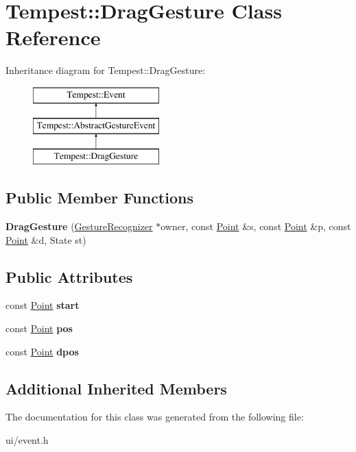 \hypertarget{class_tempest_1_1_drag_gesture}{\section{Tempest\+:\+:Drag\+Gesture Class Reference}
\label{class_tempest_1_1_drag_gesture}
}
Inheritance diagram for Tempest\+:\+:Drag\+Gesture\+:\begin{figure}[H]
\begin{center}
\leavevmode
\includegraphics[height=3.000000cm]{class_tempest_1_1_drag_gesture}
\end{center}
\end{figure}
\subsection*{Public Member Functions}
\begin{DoxyCompactItemize}
\item 
\hypertarget{class_tempest_1_1_drag_gesture_aadf2d77a7fba3ee819183beed65603e5}{{\bfseries Drag\+Gesture} (\hyperlink{class_tempest_1_1_gesture_recognizer}{Gesture\+Recognizer} $\ast$owner, const \hyperlink{struct_tempest_1_1_point}{Point} \&s, const \hyperlink{struct_tempest_1_1_point}{Point} \&p, const \hyperlink{struct_tempest_1_1_point}{Point} \&d, State st)}\label{class_tempest_1_1_drag_gesture_aadf2d77a7fba3ee819183beed65603e5}

\end{DoxyCompactItemize}
\subsection*{Public Attributes}
\begin{DoxyCompactItemize}
\item 
\hypertarget{class_tempest_1_1_drag_gesture_a9b0f64e0760ea7fcaeba8b6feac3840a}{const \hyperlink{struct_tempest_1_1_point}{Point} {\bfseries start}}\label{class_tempest_1_1_drag_gesture_a9b0f64e0760ea7fcaeba8b6feac3840a}

\item 
\hypertarget{class_tempest_1_1_drag_gesture_a80b37f0d00981933a01de73a1fbd9a0d}{const \hyperlink{struct_tempest_1_1_point}{Point} {\bfseries pos}}\label{class_tempest_1_1_drag_gesture_a80b37f0d00981933a01de73a1fbd9a0d}

\item 
\hypertarget{class_tempest_1_1_drag_gesture_a0ca0612cd82374c3625f674c43090523}{const \hyperlink{struct_tempest_1_1_point}{Point} {\bfseries dpos}}\label{class_tempest_1_1_drag_gesture_a0ca0612cd82374c3625f674c43090523}

\end{DoxyCompactItemize}
\subsection*{Additional Inherited Members}


The documentation for this class was generated from the following file\+:\begin{DoxyCompactItemize}
\item 
ui/event.\+h\end{DoxyCompactItemize}
